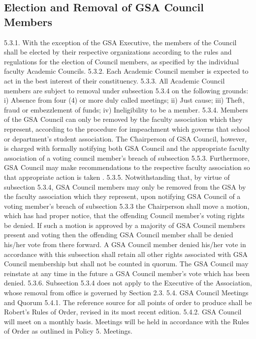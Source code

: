 \documentclass{article}
\begin{document}
\subsection{Election and Removal of GSA Council Members }
5.3.1. With the exception of the GSA Executive, the members of the Council 
shall be elected by their respective organizations according to the rules 
and regulations for the election of Council members, as specified by 
the individual faculty Academic Councils. 
5.3.2. Each Academic Council member is expected to act in the best interest 
of their constituency. 
5.3.3. All Academic Council members are subject to removal under 
subsection 5.3.4 on the following grounds: 
i) Absence from four (4) or more duly called meetings; 
ii) Just cause; 
iii) Theft, fraud or embezzlement of funds; 
iv) Ineligibility to be a member. 
5.3.4. Members of the GSA Council can only be removed by the faculty 
association which they represent, according to the procedure for 
impeachment which governs that school or department’s student 
association. The Chairperson of GSA Council, however, is charged 
with formally notifying both GSA Council and the appropriate faculty 
association of a voting council member's breach of subsection 5.5.3. 
Furthermore, GSA Council may make recommendations to the 
respective faculty association so that appropriate action is taken . 
5.3.5. Notwithstanding that, by virtue of subsection 5.3.4, GSA Council 
members may only be removed from the GSA by the faculty 
association which they represent, upon notifying GSA Council of a 
voting member's breach of subsection 5.3.3 the Chairperson shall 
move a motion, which has had proper notice, that the offending 
Council member's voting rights be denied. If such a motion is 
approved by a majority of GSA Council members present and voting 
then the offending GSA Council member shall be denied his/her vote 
from there forward. A GSA Council member denied his/her vote in 
accordance with this subsection shall retain all other rights associated 
with GSA Council membership but shall not be counted in quorum. 
The GSA Council may reinstate at any time in the future a GSA 
Council member's vote which has been denied. 
5.3.6. Subsection 5.3.4 does not apply to the Executive of the Association, 
whose removal from office is governed by Section 2.3. 
5.4. GSA Council Meetings and Quorum 
5.4.1. The reference source for all points of order to produce shall be 
Robert’s Rules of Order, revised in its most recent edition. 
5.4.2. GSA Council will meet on a monthly basis. Meetings will be held in 
accordance with the Rules of Order as outlined in Policy 5. Meetings. 
\end{document}
